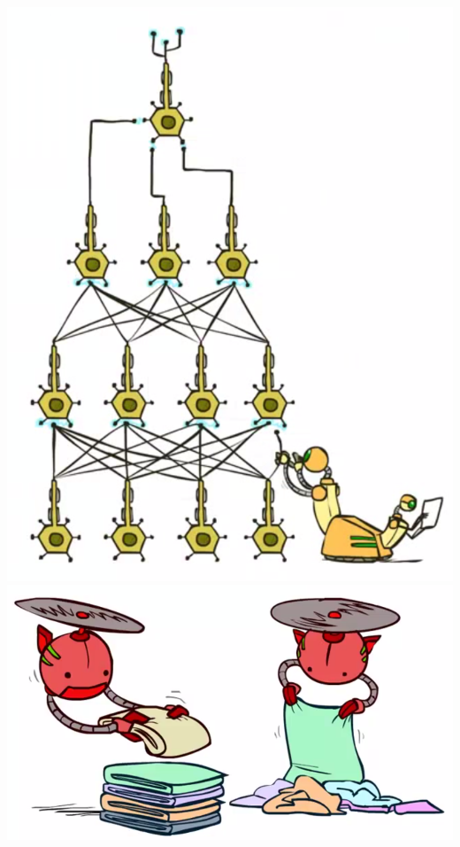 \documentclass[twocolumn]{article}
\begin{document}
{\includegraphics[scale=0.5]{snapshot168}\\
\includegraphics[scale=0.5]{snapshot169}\\
}
\end{document}
